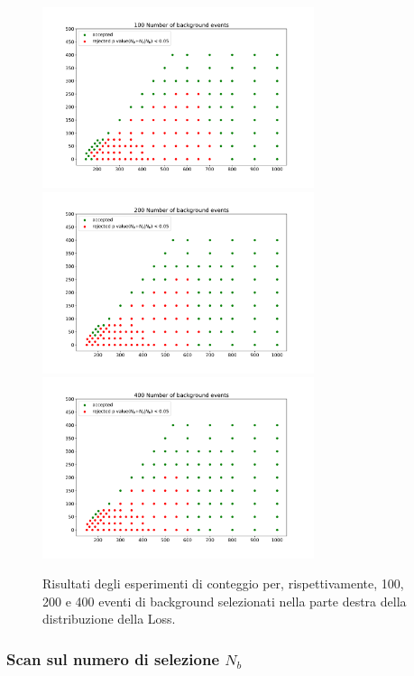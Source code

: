 \begin{figure}[h!]
	\centering
	\includegraphics[width=0.71\textwidth]{figs/risultati_simulazione/100.pdf}
	\includegraphics[width=0.71\textwidth]{figs/risultati_simulazione/200.pdf}
	\includegraphics[width=0.71\textwidth]{figs/risultati_simulazione/400.pdf}
	\caption{Risultati degli esperimenti di conteggio per, rispettivamente, 100, 200 e 400 eventi di background selezionati nella parte destra della distribuzione della Loss.}
	\label{test-100-200-400}
\end{figure}

\subsubsection{Scan sul numero di selezione $N_b$}
\label{scan su N_b}


